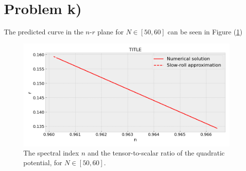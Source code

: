 \documentclass[reprint,english,notitlepage]{revtex4-1}  %
\numberwithin{equation}{section}
\begin{document}
\section{Problem k)}
The predicted curve in the $n$-$r$ plane for
$N\in[50,60]$ can be seen in Figure (\ref{fig:quadratic_slowroll-nr})
\begin{figure}[h!]
	\includegraphics[width=\linewidth]{QuadraticPotential_slowroll-nr.png}
	\caption{The spectral index $n$ and the tensor-to-scalar ratio of the
	quadratic potential, for $N\in[50,60]$.}
	\label{fig:quadratic_slowroll-nr}
\end{figure}
\end{document}
